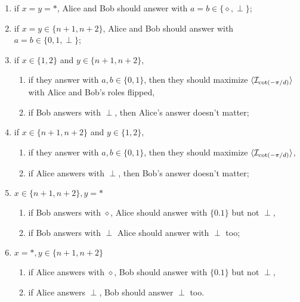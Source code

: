 \documentclass[11pt,letterpaper]{article}
\DeclarePairedDelimiter{\ip}{\langle}{\rangle}
\newcommand{\1}{\mathbb{1}}
\newcommand{\I}{\mathcal{I}}
\theoremstyle{definition}
\begin{document}
\begin{enumerate}
	\item if $x = y = \ast$, Alice and Bob should answer with $a = b \in \{\diamond, \perp\}$;
	\item if $x = y \in \{n+1, n+2\}$, Alice and Bob should answer with $a = b \in \{0, 1, \perp\}$;
	\item if $x \in \{1,2\}$ and $y \in \{n+1, n+2\}$, 
		\begin{enumerate}
		\item if they answer with $a,b \in \{0,1\}$, then
	they should maximize $\ip{\I_{\cot(-\pi/d)}}$ with Alice and Bob's roles flipped, 
		\item if Bob answers with $\perp$, then Alice's answer doesn't matter;
		\end{enumerate}
	\item if $x \in \{n+1, n+2\}$ and $y \in \{1,2\}$,
	\begin{enumerate} 
		\item if they answer with $a,b \in \{0,1\}$, then
		they should maximize $\ip{\I_{\cot(-\pi/d)}}$, 
		\item if Alice answers with $\perp$, then Bob's answer doesn't matter;
	\end{enumerate}
	\item $x \in \{n+1,n+2\}, y = \ast$ 
		\begin{enumerate}
		\item if Bob answers with $\diamond$, Alice should answer with $\{0.1\}$ but not $\perp$, 
		\item if Bob answers with $\perp$ Alice should answer with $\perp$ too;
		\end{enumerate}
	\item $x = \ast, y \in \{n+1, n+2\}$
	\begin{enumerate}
		\item if Alice answers with $\diamond$, Bob should answer with $\{0.1\}$ but not $\perp$, 
		\item if Alice answers $\perp$, Bob should answer $\perp$ too.
	\end{enumerate}
\end{enumerate}
\end{document}
